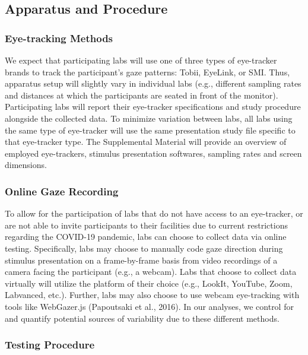 \documentclass[
  man,floatsintext]{apa6}
\begin{document}
\subsection{Apparatus and Procedure}\label{apparatus-and-procedure}

\subsubsection{Eye-tracking Methods}\label{eye-tracking-methods}

We expect that participating labs will use one of three types of eye-tracker brands to track the participant's gaze patterns: Tobii, EyeLink, or SMI. Thus, apparatus setup will slightly vary in individual labs (e.g., different sampling rates and distances at which the participants are seated in front of the monitor). Participating labs will report their eye-tracker specifications and study procedure alongside the collected data. To minimize variation between labs, all labs using the same type of eye-tracker will use the same presentation study file specific to that eye-tracker type. The Supplemental Material will provide an overview of employed eye-trackers, stimulus presentation softwares, sampling rates and screen dimensions.

\subsubsection{Online Gaze Recording}\label{online-gaze-recording}

To allow for the participation of labs that do not have access to an eye-tracker, or are not able to invite participants to their facilities due to current restrictions regarding the COVID-19 pandemic, labs can choose to collect data via online testing. Specifically, labs may choose to manually code gaze direction during stimulus presentation on a frame-by-frame basis from video recordings of a camera facing the participant (e.g., a webcam). Labs that choose to collect data virtually will utilize the platform of their choice (e.g., LookIt, YouTube, Zoom, Labvanced, etc.). Further, labs may also choose to use webcam eye-tracking with tools like WebGazer.js (Papoutsaki et al., 2016). In our analyses, we control for and quantify potential sources of variability due to these different methods.

\subsubsection{Testing Procedure}\label{testing-procedure}
\end{document}
